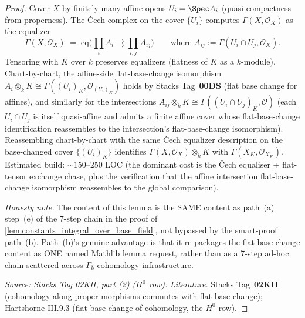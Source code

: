 \begin{proof}

\leanok
  Cover \(X\) by finitely many affine opens \(U_i = \Spec A_i\) (quasi-compactness from properness). The \v Cech complex on the cover \(\{U_i\}\) computes \(\Gamma(X, \mathcal O_X)\) as the equalizer
  \[
    \Gamma(X, \mathcal O_X) \;=\; \mathrm{eq}\bigl(\textstyle\prod_i A_i \rightrightarrows \prod_{i, j} A_{ij}\bigr) \qquad \text{where } A_{ij} := \Gamma(U_i \cap U_j, \mathcal O_X).
  \]
  Tensoring with \(K\) over \(k\) preserves equalizers (flatness of \(K\) as a \(k\)-module). Chart-by-chart, the affine-side flat-base-change isomorphism \(A_i \otimes_k K \cong \Gamma((U_i)_K, \mathcal O_{(U_i)_K})\) holds by Stacks Tag~\textbf{00DS} (flat base change for affines), and similarly for the intersections \(A_{ij} \otimes_k K \cong \Gamma((U_i \cap U_j)_K, \mathcal O)\) (each \(U_i \cap U_j\) is itself quasi-affine and admits a finite affine cover whose flat-base-change identification reassembles to the intersection's flat-base-change isomorphism). Reassembling chart-by-chart with the same \v Cech equalizer description on the base-changed cover \(\{(U_i)_K\}\) identifies \(\Gamma(X, \mathcal O_X) \otimes_k K\) with \(\Gamma(X_K, \mathcal O_{X_K})\). Estimated build: \(\sim 150\)--\(250\) LOC (the dominant cost is the \v Cech equaliser + flat-tensor exchange chase, plus the verification that the affine intersection flat-base-change isomorphism reassembles to the global comparison).

  \emph{Honesty note.} The content of this lemma is the SAME content as path~(a) step~(e) of the 7-step chain in the proof of \cref{lem:constants_integral_over_base_field}, not bypassed by the smart-proof path~(b). Path~(b)'s genuine advantage is that it re-packages the flat-base-change content as ONE named Mathlib lemma request, rather than as a 7-step ad-hoc chain scattered across \(\Gamma_{\bar k}\)-cohomology infrastructure.

  \textit{Source: Stacks Tag 02KH, part (2) (\(H^0\) row).}
  \emph{Literature.} Stacks Tag~\textbf{02KH} (cohomology along proper morphisms commutes with flat base change); Hartshorne III.9.3 (flat base change of cohomology, the \(H^0\) row).
\end{proof}

